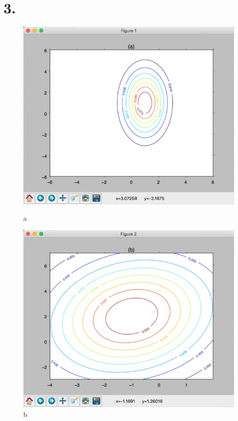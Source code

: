\documentclass[11pt]{article}
\begin{document}
\section*{3.}
\begin{figure}[H]
\begin{center}
\includegraphics[scale=0.5]{3a}
\caption{a}
\includegraphics[scale=0.5]{3b}
\caption{b}
\end{center}
\end{figure}
\newpage
\end{document}
